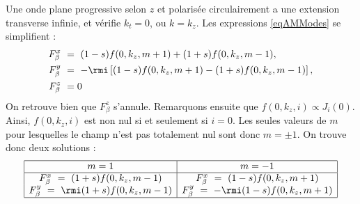 Une onde plane progressive selon $z$ et polarisée circulairement a une extension transverse infinie, et vérifie $k_t = 0$, ou $k = k_z$. Les expressions \ref{eqAMModes} se simplifient :
\begin{equation*}
\begin{aligned}
F_{\beta}^x ~&= ~(1-s)f(0,k_z,m+1)+(1+s)f(0,k_z,m-1),\\
F_{\beta}^y ~&= ~-\rmi\left[(1-s)f(0,k_z,m+1)-(1+s)f(0,k_z,m-1)\right],\\
F_{\beta}^z ~&= 0
\end{aligned}
\end{equation*}
On retrouve bien que $F_{\beta}^z$ s'annule. Remarquons ensuite que $f(0,k_z,i) \propto J_i(0)$. Ainsi, $f(0,k_z,i)$ est non nul si et seulement si $i = 0$. Les seules valeurs de $m$ pour lesquelles le champ n'est pas totalement nul sont donc $m=\pm 1$. On trouve donc deux solutions :
\[
\begin{array}{|c|c|}
	\hline
	m = 1 &m = -1 \\
	\hline
	F_{\beta}^x ~= ~(1+s)f(0,k_z,m-1) & F_{\beta}^x ~= ~(1-s)f(0,k_z,m+1)\\
		F_{\beta}^y ~= ~\rmi(1+s)f(0,k_z,m-1) & F_{\beta}^y ~= ~-\rmi(1-s)f(0,k_z,m+1)\\
		\hline
\end{array}\]

